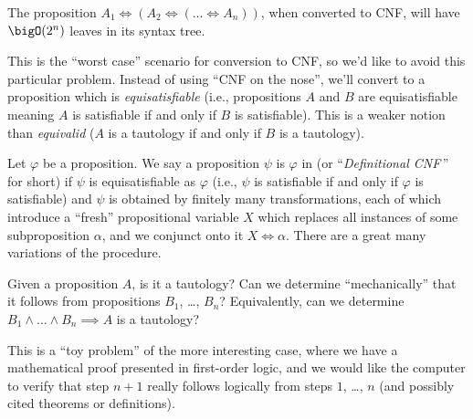 \begin{node}
\begin{definition}
\begin{node}
\end{node}

\end{definition}


\begin{theorem}
The proposition $A_{1}\iff(A_{2}\iff(\dots\iff A_{n}))$, when converted
to CNF, will have $\bigO(2^{n})$ leaves in its syntax tree.

\begin{node}\label{prop:normal-form-000K}%
This is the ``worst case'' scenario for conversion to CNF, so we'd like
to avoid this particular problem. Instead of using ``CNF on the nose'',
we'll convert to a proposition which is \emph{equisatisfiable} (i.e.,
propositions $A$ and $B$ are equisatisfiable meaning $A$ is satisfiable
if and only if $B$ is satisfiable). This is a weaker notion than
\emph{equivalid} ($A$ is a tautology if and only if $B$ is a tautology).
\end{node}
\end{theorem}


\begin{definition}\label{prop-000W}%
Let $\varphi$ be a proposition.
We say a proposition $\psi$ is $\varphi$ in 
(or ``\textit{Definitional CNF}\,'' for short) if
$\psi$ is equisatisfiable as $\varphi$ (i.e., $\psi$ is satisfiable if
and only if $\varphi$ is satisfiable) and $\psi$ is obtained by finitely
many transformations, each of which introduce a ``fresh'' propositional
variable $X$ which replaces all instances of some subproposition
$\alpha$, and we conjunct onto it $X\iff\alpha$. There are a great many
variations of the procedure.
\end{definition}

\begin{node}\label{prop:normal-form-000L}%
Given a proposition $A$, is it a tautology? Can we determine
``mechanically'' that it follows from propositions $B_{1}$, \dots, $B_{n}$?
Equivalently, can we determine $B_{1}\land\dots\land B_{n}\implies A$
is a tautology?

\begin{node}\label{prop:normal-form-000M}%
This is a ``toy problem'' of the more interesting case, where we have a
mathematical proof presented in first-order logic, and we would like the
computer to verify that step $n+1$ really follows logically from steps
$1$, \dots, $n$ (and possibly cited theorems or definitions).
\end{node}
\end{node}


\end{node}
